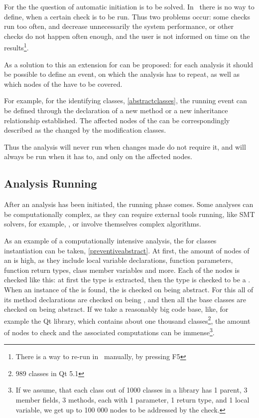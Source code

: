 For the  the question of automatic initiation is to be solved. In \jbmps\ there is no 
way to define, when a certain check is to be run. Thus two problems occur: some checks run too often, and 
decrease unnecessarily the system performance, or other checks do not happen often enough, and the user is not 
informed on time on the results\footnote{There is a way to re-run  in \jbmps\ manually,
by pressing F5}. 

As a solution to this an  extension for can be proposed: for each analysis it should be possible 
to define an event, on which the analysis has to repeat, as well as which nodes of the  have to be covered.

For example, for the  identifying  classes, \ref{abstractclasses}, the running
event can be defined through the declaration of a new method or a new inheritance relationship established. The 
affected nodes of the  can be correspondingly described as the changed by the modification classes.

Thus the analysis will never run when changes made do not require it, and will always be run when 
it has to, and only on the affected nodes.


\subsection{Analysis Running}

After an analysis has been initiated, the running phase comes. Some analyses can be computationally complex,
as they can require external tools running, like SMT solvers, for example, \cite{2012_ratiu_modular_dsls_and_analyses},
or involve themselves complex algorithms.

As an example of a computationally intensive analysis, the  for  classes 
instantiation can be taken, \ref{preventiveabstract}. At first, the amount of nodes of an  is high,
as they include local variable declarations, function parameters, function return types, class member variables
and more. Each of the nodes is checked like this: at first the type is extracted, then the type is checked to be 
a . When an instance of the  is found, the  is checked on being abstract.
For this all of its method declarations are checked on being , and then all the base classes are 
checked on being abstract. If we take a reasonably big code base, like, for example the Qt library, which contains about one thousand
classes\footnote{989 classes in Qt 5.1}, the amount of nodes to check and the associated computations can be immense\footnote{If we assume,
that each class out of 1000 classes in a library has 1 parent, 3 member fields, 3 methods, each with 1 parameter, 1 return type, and 1 local variable,
we get up to 100 000 nodes to be addressed by the check.}.

